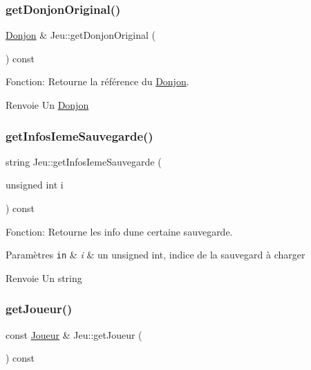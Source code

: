\subsubsection{\texorpdfstring{get\+Donjon\+Original()}{getDonjonOriginal()}}
{\footnotesize\ttfamily \mbox{\hyperlink{classDonjon}{Donjon}} \& Jeu\+::get\+Donjon\+Original (\begin{DoxyParamCaption}{ }\end{DoxyParamCaption}) const}



Fonction\+: Retourne la référence du \mbox{\hyperlink{classDonjon}{Donjon}}. 

\begin{DoxyReturn}{Renvoie}
Un \mbox{\hyperlink{classDonjon}{Donjon}} 
\end{DoxyReturn}
\mbox{\label{classJeu_aa37d1a48e9f4e8799786128f9a258860}} 
\subsubsection{\texorpdfstring{get\+Infos\+Ieme\+Sauvegarde()}{getInfosIemeSauvegarde()}}
{\footnotesize\ttfamily string Jeu\+::get\+Infos\+Ieme\+Sauvegarde (\begin{DoxyParamCaption}\item[{unsigned int}]{i }\end{DoxyParamCaption}) const}



Fonction\+: Retourne les info d\textquotesingle{}une certaine sauvegarde. 


\begin{DoxyParams}[1]{Paramètres}
\mbox{\tt in}  & {\em i} & un unsigned int, indice de la sauvegard à charger \\
\hline
\end{DoxyParams}
\begin{DoxyReturn}{Renvoie}
Un string 
\end{DoxyReturn}
\mbox{\label{classJeu_ac599e64df949f108bcbf87551f568550}} 
\subsubsection{\texorpdfstring{get\+Joueur()}{getJoueur()}}
{\footnotesize\ttfamily const \mbox{\hyperlink{classJoueur}{Joueur}} \& Jeu\+::get\+Joueur (\begin{DoxyParamCaption}{ }\end{DoxyParamCaption}) const}



